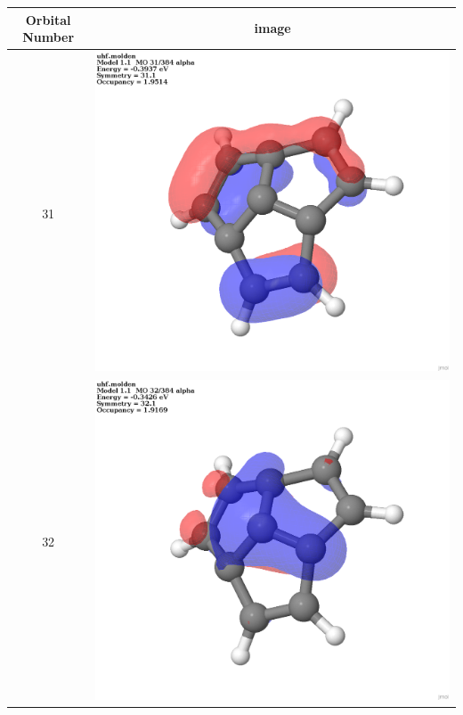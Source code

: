 \documentclass{article}
\begin{document}
\begin{tabular}{|c|c|}
\hline Orbital Number& image\\\hline
31 & \includegraphics[scale=0.1]{M1T_31.png}\\ \hline
32 & \includegraphics[scale=0.1]{M1T_32.png}\\ \hline

\end{tabular}
\end{document}

